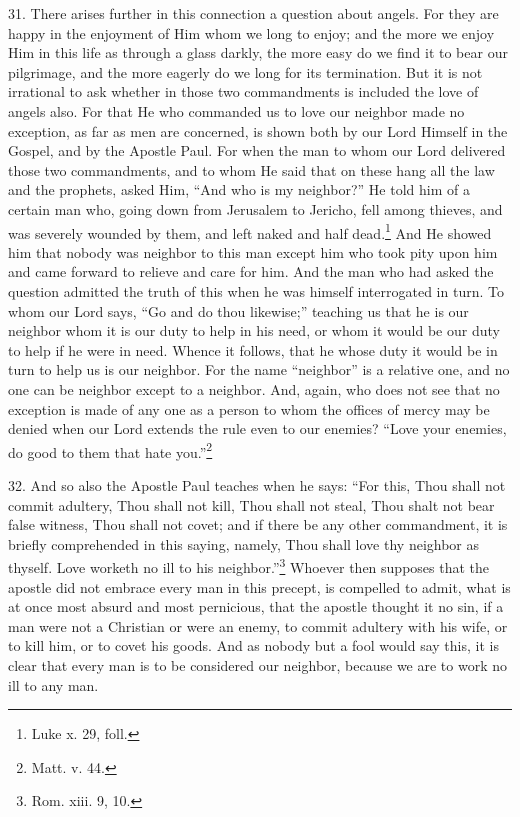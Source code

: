 31. There arises further in this connection a question about angels. For they are happy in the enjoyment of Him whom we long to enjoy; and the more we enjoy Him in this life as through a glass darkly, the more easy do we find it to bear our pilgrimage, and the more eagerly do we long for its termination. But it is not irrational to ask whether in those two commandments is included the love of angels also. For that He who commanded us to love our neighbor made no exception, as far as men are concerned, is shown both by our Lord Himself in the Gospel, and by the Apostle Paul. For when the man to whom our Lord delivered those two commandments, and to whom He said that on these hang all the law and the prophets, asked Him, “And who is my neighbor?” He told him of a certain man who, going down from Jerusalem to Jericho, fell among thieves, and was  severely wounded by them, and left naked and half dead.\footnote{Luke x. 29, foll.} And He showed him that nobody was neighbor to this man except him who took pity upon him and came forward to relieve and care for him. And the man who had asked the question admitted the truth of this when he was himself interrogated in turn. To whom our Lord says, “Go and do thou likewise;” teaching us that he is our neighbor whom it is our duty to help in his need, or whom it would be our duty to help if he were in need. Whence it follows, that he whose duty it would be in turn to help us is our neighbor. For the name “neighbor” is a relative one, and no one can be neighbor except to a neighbor. And, again, who does not see that no exception is made of any one as a person to whom the offices of mercy may be denied when our Lord extends the rule even to our enemies? “Love your enemies, do good to them that hate you.”\footnote{Matt. v. 44.}

32. And so also the Apostle Paul teaches when he says: “For this, Thou shall not commit adultery, Thou shall not kill, Thou shall not steal, Thou shalt not bear false witness, Thou shall not covet; and if there be any other commandment, it is briefly comprehended in this saying, namely, Thou shall love thy neighbor as thyself. Love worketh no ill to his neighbor.”\footnote{Rom. xiii. 9, 10.} Whoever then supposes that the apostle did not embrace every man in this precept, is compelled to admit, what is at once most absurd and most pernicious, that the apostle thought it no sin, if a man were not a Christian or were an enemy, to commit adultery with his wife, or to kill him, or to covet his goods. And as nobody but a fool would say this, it is clear that every man is to be considered our neighbor, because we are to work no ill to any man.

